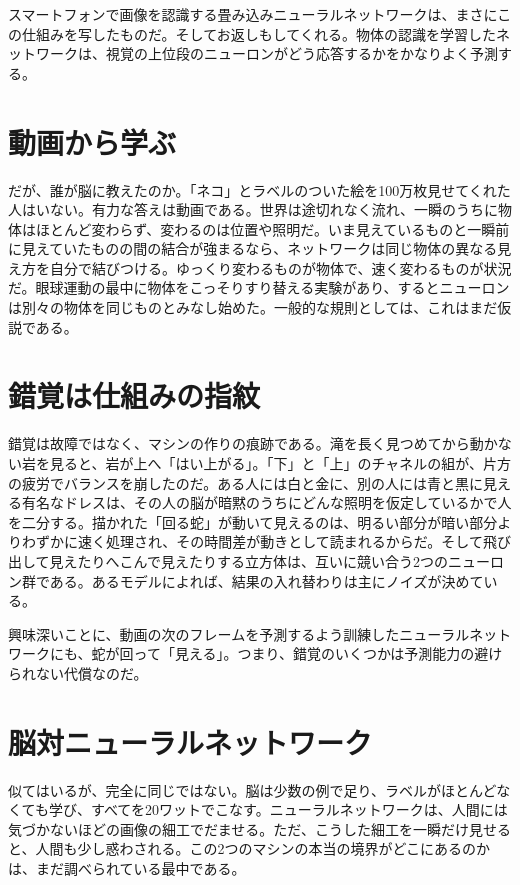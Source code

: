 スマートフォンで画像を認識する畳み込みニューラルネットワークは、まさにこの仕組みを写したものだ。そしてお返しもしてくれる。物体の認識を学習したネットワークは、視覚の上位段のニューロンがどう応答するかをかなりよく予測する。

\section*{動画から学ぶ}

だが、誰が脳に教えたのか。「ネコ」とラベルのついた絵を100万枚見せてくれた人はいない。有力な答えは動画である。世界は途切れなく流れ、一瞬のうちに物体はほとんど変わらず、変わるのは位置や照明だ。いま見えているものと一瞬前に見えていたものの間の結合が強まるなら、ネットワークは同じ物体の異なる見え方を自分で結びつける。ゆっくり変わるものが物体で、速く変わるものが状況だ。眼球運動の最中に物体をこっそりすり替える実験があり、するとニューロンは別々の物体を同じものとみなし始めた。一般的な規則としては、これはまだ仮説である。

\section*{錯覚は仕組みの指紋}

錯覚は故障ではなく、マシンの作りの痕跡である。滝を長く見つめてから動かない岩を見ると、岩が上へ「はい上がる」。「下」と「上」のチャネルの組が、片方の疲労でバランスを崩したのだ。ある人には白と金に、別の人には青と黒に見える有名なドレスは、その人の脳が暗黙のうちにどんな照明を仮定しているかで人を二分する。描かれた「回る蛇」が動いて見えるのは、明るい部分が暗い部分よりわずかに速く処理され、その時間差が動きとして読まれるからだ。そして飛び出して見えたりへこんで見えたりする立方体は、互いに競い合う2つのニューロン群である。あるモデルによれば、結果の入れ替わりは主にノイズが決めている。

興味深いことに、動画の次のフレームを予測するよう訓練したニューラルネットワークにも、蛇が回って「見える」。つまり、錯覚のいくつかは予測能力の避けられない代償なのだ。

\section*{脳対ニューラルネットワーク}

似てはいるが、完全に同じではない。脳は少数の例で足り、ラベルがほとんどなくても学び、すべてを20ワットでこなす。ニューラルネットワークは、人間には気づかないほどの画像の細工でだませる。ただ、こうした細工を一瞬だけ見せると、人間も少し惑わされる。この2つのマシンの本当の境界がどこにあるのかは、まだ調べられている最中である。

